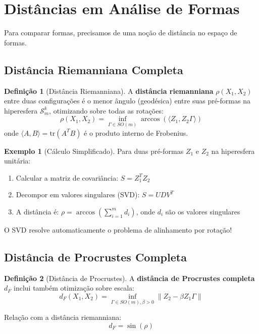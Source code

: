 \documentclass[12pt,a4paper]{article}
\theoremstyle{definition}
\newtheorem{definicao}{Definição}[section]
\newtheorem{exemplo}{Exemplo}[section]
\begin{document}
\section{Distâncias em Análise de Formas}

Para comparar formas, precisamos de uma noção de distância no espaço de formas.

\subsection{Distância Riemanniana Completa}

\begin{definicao}[Distância Riemanniana]
A \textbf{distância riemanniana} $\rho(X_1, X_2)$ entre duas configurações é o menor ângulo (geodésica) entre suas pré-formas na hiperesfera $\mathcal{S}_m^k$, otimizando sobre todas as rotações:
\begin{equation}
\rho(X_1, X_2) = \inf_{\Gamma \in SO(m)} \arccos(\langle Z_1, Z_2\Gamma \rangle)
\end{equation}
onde $\langle A, B \rangle = \text{tr}(A^TB)$ é o produto interno de Frobenius.
\end{definicao}

\begin{exemplo}[Cálculo Simplificado]
Para duas pré-formas $Z_1$ e $Z_2$ na hiperesfera unitária:
\begin{enumerate}
    \item Calcular a matriz de covariância: $S = Z_1^T Z_2$
    \item Decompor em valores singulares (SVD): $S = UDV^T$
    \item A distância é: $\rho = \arccos(\sum_{i=1}^m d_i)$, onde $d_i$ são os valores singulares
\end{enumerate}
O SVD resolve automaticamente o problema de alinhamento por rotação!
\end{exemplo}

\subsection{Distância de Procrustes Completa}

\begin{definicao}[Distância de Procrustes]
A \textbf{distância de Procrustes completa} $d_F$ inclui também otimização sobre escala:
\begin{equation}
d_F(X_1, X_2) = \inf_{\Gamma \in SO(m), \beta > 0} \|Z_2 - \beta Z_1\Gamma\|
\end{equation}

Relação com a distância riemanniana:
\begin{equation}
d_F = \sin(\rho)
\end{equation}
\end{definicao}
\end{document}
